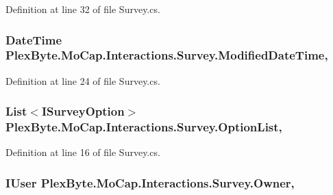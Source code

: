 Definition at line 32 of file Survey.\+cs.

\subsubsection[{\texorpdfstring{Modified\+Date\+Time}{ModifiedDateTime}}]{\setlength{\rightskip}{0pt plus 5cm}Date\+Time Plex\+Byte.\+Mo\+Cap.\+Interactions.\+Survey.\+Modified\+Date\+Time\hspace{0.3cm}{\ttfamily [get]}, {\ttfamily [set]}}\hypertarget{class_plex_byte_1_1_mo_cap_1_1_interactions_1_1_survey_adcfad739d1a4acf70ed60a035716f1d1}{}\label{class_plex_byte_1_1_mo_cap_1_1_interactions_1_1_survey_adcfad739d1a4acf70ed60a035716f1d1}


Definition at line 24 of file Survey.\+cs.

\subsubsection[{\texorpdfstring{Option\+List}{OptionList}}]{\setlength{\rightskip}{0pt plus 5cm}List$<${\bf I\+Survey\+Option}$>$ Plex\+Byte.\+Mo\+Cap.\+Interactions.\+Survey.\+Option\+List\hspace{0.3cm}{\ttfamily [get]}, {\ttfamily [set]}}\hypertarget{class_plex_byte_1_1_mo_cap_1_1_interactions_1_1_survey_adacfcf5546425c676756bd12772cb4e2}{}\label{class_plex_byte_1_1_mo_cap_1_1_interactions_1_1_survey_adacfcf5546425c676756bd12772cb4e2}


Definition at line 16 of file Survey.\+cs.

\subsubsection[{\texorpdfstring{Owner}{Owner}}]{\setlength{\rightskip}{0pt plus 5cm}I\+User Plex\+Byte.\+Mo\+Cap.\+Interactions.\+Survey.\+Owner\hspace{0.3cm}{\ttfamily [get]}, {\ttfamily [set]}}\hypertarget{class_plex_byte_1_1_mo_cap_1_1_interactions_1_1_survey_ae4f5e62e3d0f98f34551ec82003ff2ee}{}\label{class_plex_byte_1_1_mo_cap_1_1_interactions_1_1_survey_ae4f5e62e3d0f98f34551ec82003ff2ee}


